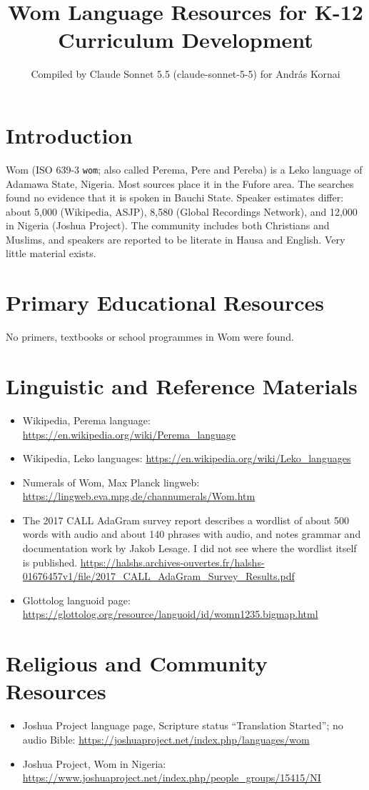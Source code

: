 \documentclass[12pt]{article}
\title{Wom Language Resources for K-12 Curriculum Development}
\author{Compiled by Claude Sonnet 5.5 (claude-sonnet-5-5) for Andr\'as Kornai}
\date{}
\begin{document}
\maketitle

\section{Introduction}
Wom (ISO 639-3 \texttt{wom}; also called Perema, Pere and Pereba) is a Leko language of Adamawa State, Nigeria. Most sources place it in the Fufore area. The searches found no evidence that it is spoken in Bauchi State. Speaker estimates differ: about 5,000 (Wikipedia, ASJP), 8,580 (Global Recordings Network), and 12,000 in Nigeria (Joshua Project). The community includes both Christians and Muslims, and speakers are reported to be literate in Hausa and English. Very little material exists.

\section{Primary Educational Resources}
No primers, textbooks or school programmes in Wom were found.

\section{Linguistic and Reference Materials}
\begin{itemize}
\item Wikipedia, Perema language: \url{https://en.wikipedia.org/wiki/Perema_language}
\item Wikipedia, Leko languages: \url{https://en.wikipedia.org/wiki/Leko_languages}
\item Numerals of Wom, Max Planck lingweb: \url{https://lingweb.eva.mpg.de/channumerals/Wom.htm}
\item The 2017 CALL AdaGram survey report describes a wordlist of about 500 words with audio and about 140 phrases with audio, and notes grammar and documentation work by Jakob Lesage. I did not see where the wordlist itself is published. \url{https://halshs.archives-ouvertes.fr/halshs-01676457v1/file/2017_CALL_AdaGram_Survey_Results.pdf}
\item Glottolog languoid page: \url{https://glottolog.org/resource/languoid/id/womn1235.bigmap.html}
\end{itemize}

\section{Religious and Community Resources}
\begin{itemize}
\item Joshua Project language page, Scripture status ``Translation Started''; no audio Bible: \url{https://joshuaproject.net/index.php/languages/wom}
\item Joshua Project, Wom in Nigeria: \url{https://www.joshuaproject.net/index.php/people_groups/15415/NI}
\end{itemize}
\end{document}

